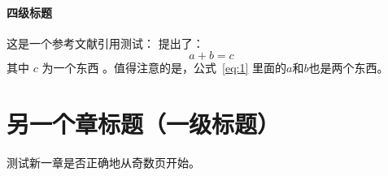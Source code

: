 \subsubsection{四级标题}

这是一个参考文献引用测试：\citet{mittelbach2004,张琪昌2005} 提出了：
\begin{equation}\label{eq:1}
    a + b = c
\end{equation}
其中 $c$ 为一个东西 \citep{ctex2022,kottwitz2015,张琪昌2005}。值得注意的是，公式~\ref{eq:1} 里面的$a$和$b$也是两个东西。

\chapter{另一个章标题（一级标题）}

测试新一章是否正确地从奇数页开始。